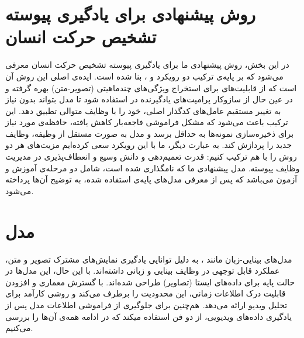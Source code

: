 \section{روش پیشنهادی برای یادگیری پیوسته تشخیص حرکت انسان}
در این بخش، روش پیشنهادی ما برای یادگیری پیوسته تشخیص حرکت انسان معرفی می‌شود که بر پایه‌ی ترکیب دو رویکرد  و ، بنا شده است. ایده‌ی اصلی این روش آن است که از قابلیت‌های  برای استخراج ویژگی‌های چندماهیتی (تصویر-متن) بهره گرفته و در عین حال از سازوکار پرامپت‌های یادگیرنده در  استفاده شود تا مدل بتواند بدون نیاز به تغییر مستقیم عامل‌های کدگذار اصلی، خود را با وظایف متوالی تطبیق دهد. این ترکیب باعث می‌شود که مشکل فراموشی فاجعه‌بار کاهش یافته، حافظه‌ی مورد نیاز برای ذخیره‌سازی نمونه‌ها به حداقل برسد و مدل به صورت مستقل از وظیفه، وظایف جدید را پردازش کند. به عبارت دیگر، ما با این رویکرد سعی کرده‌ایم مزیت‌های هر دو روش را با هم ترکیب کنیم: قدرت تعمیم‌دهی و دانش وسیع  و انعطاف‌پذیری  در مدیریت وظایف پیوسته. مدل پیشنهادی ما که  
نامگذاری شده است، شامل دو مرحله‌‌ی آموزش  و آزمون می‌باشد که پس از معرفی مدل‌های پایه‌‌ی استفاده شده، به توضیح آن‌ها پرداخته می‌شود.
\section{مدل }
مدل‌های بینایی-زبان مانند ، به دلیل توانایی یادگیری نمایش‌های مشترک تصویر و متن، عملکرد قابل توجهی در وظایف بینایی و زبانی داشته‌اند. با این حال، این مدل‌ها در حالت پایه برای داده‌های ایستا (تصاویر) طراحی شده‌اند.  با گسترش معماری  و افزودن قابلیت درک اطلاعات زمانی، این محدودیت را برطرف می‌کند و روشی کارآمد برای تحلیل ویدیو ارائه می‌دهد. هم‌چنین برای جلوگیری از فراموشی اطلاعات مدل  پس از یادگیری داده‌های ویدیویی، از دو فن استفاده میکند که در ادامه همه‌ی آن‌ها را بررسی می‌کنیم. 
